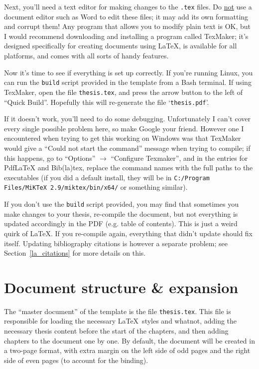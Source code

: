 Next, you'll need a text editor for making changes to the \verb+.tex+ files. Do \underline{not} use a document editor such as Word to edit these files; it may add its own formatting and corrupt them! Any program that allows you to modify plain text is OK, but I would recommend downloading and installing a program called TexMaker; it's designed specifically for creating documents using \LaTeX, is available for all platforms, and comes with all sorts of handy features.

Now it's time to see if everything is set up correctly. If you're running Linux, you can run the \verb+build+ script provided in the template from a Bash terminal. If using TexMaker, open the file \verb+thesis.tex+, and press the arrow button to the left of ``Quick Build''. Hopefully this will re-generate the file `\verb+thesis.pdf+'.

If it doesn't work, you'll need to do some debugging. Unfortunately I can't cover every single possible problem here, so make Google your friend. However one I encountered when trying to get this working on Windows was that TexMaker would give a ``Could not start the command'' message when trying to compile; if this happens, go to ``Options'' $\rightarrow$ ``Configure Texmaker'', and in the entries for PdfLaTeX and Bib(la)tex, replace the command names with the full paths to the executables (if you did a default install, they will be in \verb+C:/Program Files/MiKTeX 2.9/miktex/bin/x64/+ or something similar).

If you don't use the \verb+build+ script provided, you may find that sometimes you make changes to your thesis, re-compile the document, but not everything is updated accordingly in the PDF (e.g. table of contents). This is just a weird quirk of \LaTeX. If you re-compile again, everything that didn't update should fix itself. Updating bibliography citations is however a separate problem; see Section~\ref{la_citations} for more details on this.
%
%
\section{Document structure \& expansion}
\label{la_structure}
%
The ``master document'' of the template is the file \verb+thesis.tex+. This file is responsible for loading the necessary \LaTeX~styles and whatnot, adding the necessary thesis content before the start of the chapters, and then adding chapters to the document one by one. By default, the document will be created in a two-page format, with extra margin on the left side of odd pages and the right side of even pages (to account for the binding).

